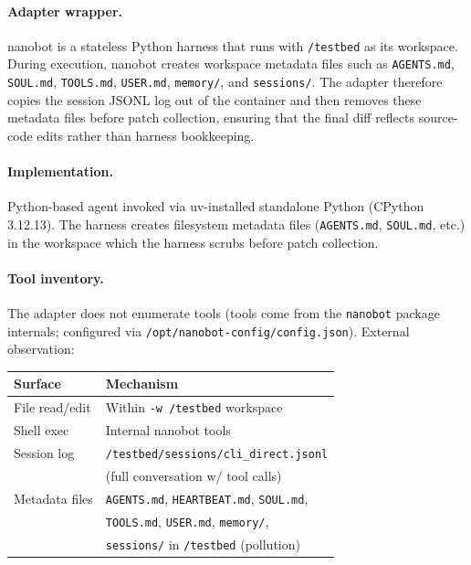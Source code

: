 \documentclass{llmxive}
\begin{document}
\paragraph{Adapter wrapper.}
nanobot is a stateless Python harness that runs with \texttt{/testbed} as its workspace. During execution, nanobot creates workspace metadata files such as \texttt{AGENTS.md}, \texttt{SOUL.md}, \texttt{TOOLS.md}, \texttt{USER.md}, \texttt{memory/}, and \texttt{sessions/}. The adapter therefore copies the session JSONL log out of the container and then removes these metadata files before patch collection, ensuring that the final diff reflects source-code edits rather than harness bookkeeping.


\paragraph{Implementation.}
Python-based agent invoked via uv-installed standalone Python (CPython 3.12.13). The harness creates filesystem metadata files (\texttt{AGENTS.md}, \texttt{SOUL.md}, etc.) in the workspace which the harness scrubs before patch collection.

\paragraph{Tool inventory.}
The adapter does not enumerate tools (tools come from the \texttt{nanobot} package internals; configured via \texttt{/opt/nanobot-config/config.json}). External observation:

\begin{center}
\begin{tabular}{ll}
\toprule
\textbf{Surface} & \textbf{Mechanism} \\
\midrule
File read/edit  & Within \texttt{-w /testbed} workspace \\
Shell exec      & Internal nanobot tools \\
Session log     & \texttt{/testbed/sessions/cli\_direct.jsonl} \\
                & (full conversation w/ tool calls) \\
Metadata files  & \texttt{AGENTS.md}, \texttt{HEARTBEAT.md}, \texttt{SOUL.md}, \\
                & \texttt{TOOLS.md}, \texttt{USER.md}, \texttt{memory/}, \\
                & \texttt{sessions/} in \texttt{/testbed} (pollution) \\
\bottomrule
\end{tabular}
\end{center}
\end{document}
